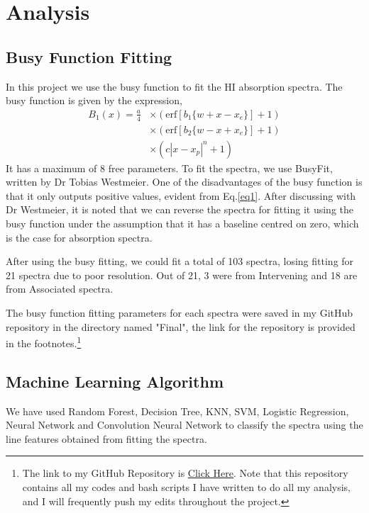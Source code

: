 \documentclass[10pt,twocolumn,letterpaper]{article}
\begin{document}
\section{Analysis}
\subsection{Busy Function Fitting} \label{sec3.1}
In this project we use the busy function to fit the HI absorption spectra\cite{8}. The busy function is given by the expression,
\begin{equation} \label{eq1}
\begin{aligned}
    B_1(x) = \frac{a}{4}&\times\left( \text{erf}[b_1\{w + x - x_e\}] + 1\right)\\
    & \times \left( \text{erf}[b_2\{w - x + x_e\}] + 1\right) \\ 
    & \times \left( c|x - x_p|^n + 1 \right)
\end{aligned}
\end{equation}
It has a maximum of 8 free parameters. To fit the spectra, we use BusyFit, written by Dr Tobias Westmeier\cite{8}. One of the disadvantages of the busy function is that it only outputs positive values, evident from Eq.\eqref{eq1}. After discussing with Dr Westmeier, it is noted that we can reverse the spectra for fitting it using the busy function under the assumption that it has a baseline centred on zero, which is the case for absorption spectra.

After using the busy fitting, we could fit a total of 103 spectra, losing fitting for 21 spectra due to poor resolution. Out of 21, 3 were from Intervening and 18 are from Associated spectra.

The busy function fitting parameters for each spectra were saved in my GitHub repository in the directory named "Final", the link for the repository is provided in the footnotes.\footnote{The link to my GitHub Repository is \href{https://github.com/Anirudh-Srivastha-Nemmani/HI_Classification.git}{Click Here}. Note that this repository contains all my codes and bash scripts I have written to do all my analysis, and I will frequently push my edits throughout the project.}

\subsection{Machine Learning Algorithm} \label{sec3.2}

We have used Random Forest, Decision Tree, KNN, SVM, Logistic Regression, Neural Network and Convolution Neural Network to classify the spectra using the line features obtained from fitting the spectra.
\end{document}
